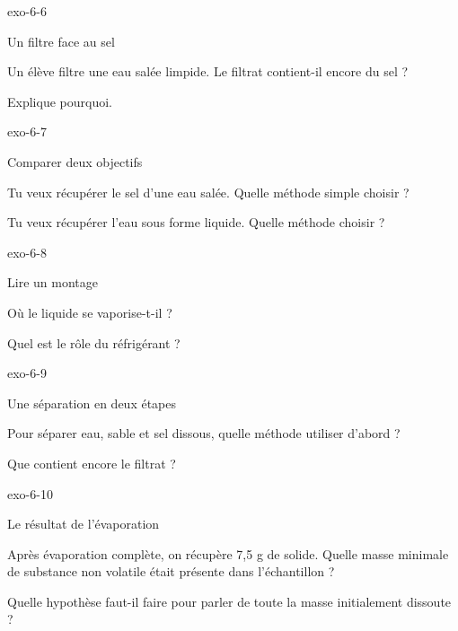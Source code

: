 \documentclass[12pt,twoside,openany]{book}
\begin{document}
\begin{blocLivre}{exo-6-6}
\begin{exercice}[2]{Un filtre face au sel}
\begin{questions}
\item Un élève filtre une eau salée limpide. Le filtrat contient-il encore du sel ?
\item Explique pourquoi.
\end{questions}
\end{exercice}\end{blocLivre}
\begin{blocLivre}{exo-6-7}
\begin{exercice}[2]{Comparer deux objectifs}
\begin{questions}
\item Tu veux récupérer le sel d’une eau salée. Quelle méthode simple choisir ?
\item Tu veux récupérer l’eau sous forme liquide. Quelle méthode choisir ?
\end{questions}
\end{exercice}\end{blocLivre}
\begin{blocLivre}{exo-6-8}
\begin{exercice}[2]{Lire un montage}
\begin{questions}
\item Où le liquide se vaporise-t-il ?
\item Quel est le rôle du réfrigérant ?
\end{questions}
\end{exercice}\end{blocLivre}
\begin{blocLivre}{exo-6-9}
\begin{exercice}[2]{Une séparation en deux étapes}
\begin{questions}
\item Pour séparer eau, sable et sel dissous, quelle méthode utiliser d’abord ?
\item Que contient encore le filtrat ?
\end{questions}
\end{exercice}\end{blocLivre}
\begin{blocLivre}{exo-6-10}
\begin{exercice}[2]{Le résultat de l’évaporation}
\begin{questions}
\item Après évaporation complète, on récupère 7,5 g de solide. Quelle masse minimale de substance non volatile était présente dans l’échantillon ?
\item Quelle hypothèse faut-il faire pour parler de toute la masse initialement dissoute ?
\end{questions}
\end{exercice}\end{blocLivre}
\end{document}
